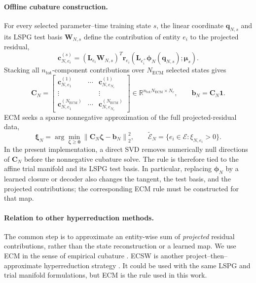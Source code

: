 \documentclass[11pt]{article}
\newcommand{\q}{\mathbf q}
\newcommand{\mub}{\bm\mu}
\newcommand{\norm}[1]{\left\lVert #1 \right\rVert}
\begin{document}
\paragraph{Offline cubature construction.}
For every selected parameter--time training state $s$, the linear coordinate
$\q_{N,s}$ and its LSPG test basis $\mathbf W_{N,s}$ define the contribution
of entity $e_i$ to the projected residual,
\begin{equation}
\mathbf c_{N,e_i}^{(s)}=(\mathbf L_{e_i}\mathbf W_{N,s})^T
\mathbf r_{e_i}(\mathbf L_{e_i^+}\boldsymbol\phi_N(\q_{N,s});\mub_s).
\label{eq:linear-ecm-contribution}
\end{equation}
Stacking all $n_{\mathrm{tot}}$-component contributions over
$N_{\mathrm{ECM}}$ selected states gives
\begin{equation}
\mathbf C_N=
\begin{bmatrix}
\mathbf c_{N,e_1}^{(1)} & \cdots & \mathbf c_{N,e_{N_e}}^{(1)}\\
\vdots & & \vdots\\
\mathbf c_{N,e_1}^{(N_{\mathrm{ECM}})} & \cdots &
\mathbf c_{N,e_{N_e}}^{(N_{\mathrm{ECM}})}
\end{bmatrix}
\in\mathbb R^{n_{\mathrm{tot}}N_{\mathrm{ECM}}\times N_e},
\qquad \mathbf b_N=\mathbf C_N\mathbf1.
\label{eq:linear-ecm-training-matrix}
\end{equation}
ECM seeks a sparse nonnegative approximation of the full projected-residual
data,
\begin{equation}
\boldsymbol\xi_N=\arg\min_{\boldsymbol\zeta\geq\mathbf0}
\norm{\mathbf C_N\boldsymbol\zeta-\mathbf b_N}_2^2,\qquad
\widetilde{\mathcal E}_N=\{e_i\in\mathcal E:\xi_{N,e_i}>0\}.
\label{eq:linear-ecm}
\end{equation}
In the present implementation, a direct SVD removes numerically null
directions of $\mathbf C_N$ before the nonnegative cubature solve.  The rule
is therefore tied to the affine trial manifold and its LSPG test basis.  In
particular, replacing $\boldsymbol\phi_N$ by a learned closure or decoder
also changes the tangent, the test basis, and the projected contributions;
the corresponding ECM rule must be constructed for that map.

\paragraph{Relation to other hyperreduction methods.}
The common step is to approximate an entity-wise sum of \emph{projected}
residual contributions, rather than the state reconstruction or a learned
map.  We use ECM in the sense of empirical cubature
\cite{hernandez2017dimensional,hernandez2020multiscale}.  ECSW is another
project--then--approximate hyperreduction strategy
\cite{farhat2015structure}.  It could be used with the same LSPG and trial
manifold formulations, but ECM is the rule used in this work.
\end{document}
